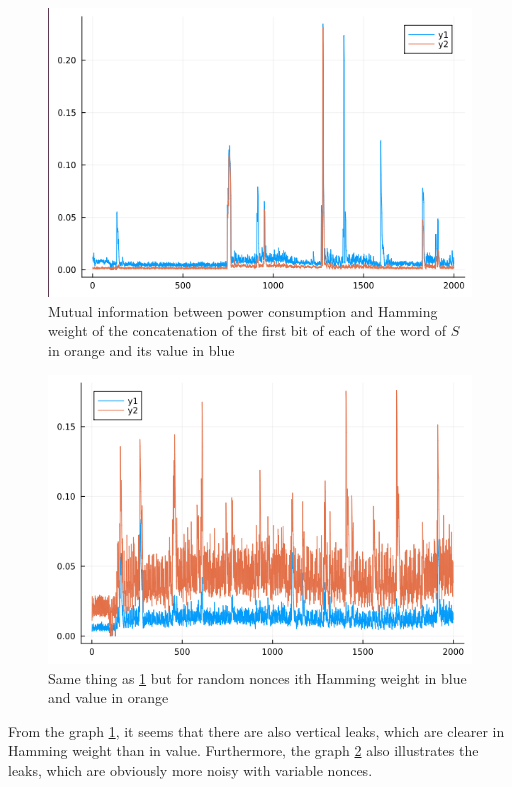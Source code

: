 \documentclass[a4paper,11pt,twocolumn]{article}
\begin{document}
	\begin{figure}[h]
		\centering
		\includegraphics[scale=0.3]{vertical_one_bit}
		\caption{Mutual information between power consumption and Hamming weight of the concatenation of the first bit of each of the word of $S$ in orange and its value in blue}
		\label{vHW}
	\end{figure}
	
	\begin{figure}[h]
		\centering
		\includegraphics[scale=0.3]{vertical_one_byte}
		\caption{Same thing as \ref{vHW} but for random nonces ith Hamming weight in blue and value in orange}
		\label{vHW&val}
	\end{figure}
	
	From the graph \ref{vHW}, it seems that there are also vertical leaks, which are clearer in Hamming weight than in value. Furthermore, the graph \ref{vHW&val} also illustrates the leaks, which are obviously more noisy with variable nonces.
	
\end{document}

